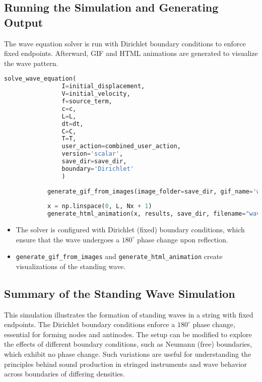\documentclass{article}
\begin{document}
		 \subsection{Running the Simulation and Generating Output}
		 
		 The wave equation solver is run with Dirichlet boundary conditions to enforce fixed endpoints. Afterward, GIF and HTML animations are generated to visualize the wave pattern.
		 
		 \begin{lstlisting}[language=Python]
		 	solve_wave_equation(
			 	I=initial_displacement,
			 	V=initial_velocity,
			 	f=source_term,
			 	c=c,
			 	L=L,
			 	dt=dt,
			 	C=C,
			 	T=T,
			 	user_action=combined_user_action,
			 	version='scalar',
			 	save_dir=save_dir,
			 	boundary='Dirichlet'
			 	)
		 	
		 	generate_gif_from_images(image_folder=save_dir, gif_name='wave_animation.gif', duration=0.1)
		 	
		 	x = np.linspace(0, L, Nx + 1)
		 	generate_html_animation(x, results, save_dir, filename="wave_animation.html", ymin=-A, ymax=A, fps=10)
		 \end{lstlisting}
		 
		 \begin{itemize}
		 	\item The solver is configured with Dirichlet (fixed) boundary conditions, which ensure that the wave undergoes a \(180^\circ\) phase change upon reflection.
		 	\item \texttt{generate\_gif\_from\_images} and \texttt{generate\_html\_animation} create visualizations of the standing wave.
		 \end{itemize}
		 
		 \subsection{Summary of the Standing Wave Simulation}
		 
		 This simulation illustrates the formation of standing waves in a string with fixed endpoints. The Dirichlet boundary conditions enforce a \(180^\circ\) phase change, essential for forming nodes and antinodes. The setup can be modified to explore the effects of different boundary conditions, such as Neumann (free) boundaries, which exhibit no phase change. Such variations are useful for understanding the principles behind sound production in stringed instruments and wave behavior across boundaries of differing densities.
	 
\end{document}
